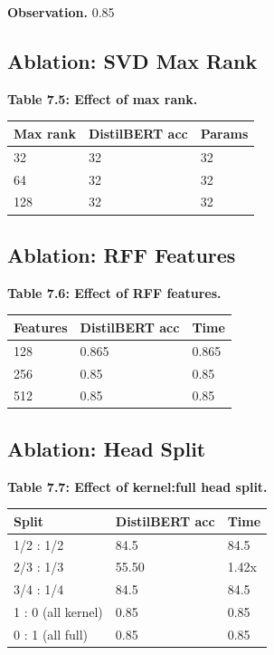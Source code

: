 \textbf{Observation.} 0.85

\subsection{Ablation: SVD Max Rank}

\textbf{Table 7.5: Effect of max rank.}

\begin{table}[H]
\centering
\small
\begin{tabular}{lll}
\toprule
\textbf{Max rank} & \textbf{DistilBERT acc} & \textbf{Params} \\
\midrule
32 & 32 & 32 \\
64 & 32 & 32 \\
128 & 32 & 32 \\
\bottomrule
\end{tabular}
\end{table}

\subsection{Ablation: RFF Features}

\textbf{Table 7.6: Effect of RFF features.}

\begin{table}[H]
\centering
\small
\begin{tabular}{lll}
\toprule
\textbf{Features} & \textbf{DistilBERT acc} & \textbf{Time} \\
\midrule
128 & 0.865 & 0.865 \\
256 & 0.85 & 0.85 \\
512 & 0.85 & 0.85 \\
\bottomrule
\end{tabular}
\end{table}

\subsection{Ablation: Head Split}

\textbf{Table 7.7: Effect of kernel:full head split.}

\begin{table}[H]
\centering
\small
\begin{tabular}{lll}
\toprule
\textbf{Split} & \textbf{DistilBERT acc} & \textbf{Time} \\
\midrule
1/2 : 1/2 & 84.5 & 84.5 \\
2/3 : 1/3 & 55.50 & 1.42x \\
3/4 : 1/4 & 84.5 & 84.5 \\
1 : 0 (all kernel) & 0.85 & 0.85 \\
0 : 1 (all full) & 0.85 & 0.85 \\
\bottomrule
\end{tabular}
\end{table}


